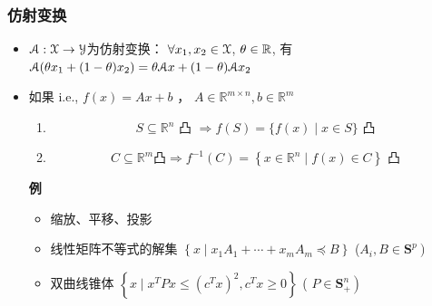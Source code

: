 \documentclass[handout]{beamer}
\begin{document}
\begin{frame}
	\frametitle{仿射变换}

\begin{itemize}
	\item {} $\mathcal{A}:\mathcal{X}\rightarrow\mathcal{Y}$为仿射变换： $\forall x_1,x_2 
	\in \mathcal{X}$, $\theta\in \mathbb{R}$, 
	有 $\mathcal{A}(\theta x_1 + (1-\theta) x_2) = \theta  \mathcal{A} x + (1-\theta) \mathcal{A} x_2$
  \item
	如果  i.e.,
$ f(x)=A x+b $ ， $ A \in \mathbb{R}^{m \times n}, b \in \mathbb{R}^{m} $
	\begin{enumerate}
		\item {}
		\begin{equation}
			S \subseteq \mathbb{R}^{n} \text { 凸 } \Longrightarrow f(S)=\{f(x) \mid x \in S\} \text { 凸 }
		\end{equation}
		\item {}
		\begin{equation}
			C \subseteq \mathbb{R}^{m} \text {凸} \Longrightarrow f^{-1}(C)=\left\{x \in \mathbb{R}^{n} \mid f(x) \in C\right\} \text { 凸 }
		\end{equation}
	\end{enumerate}


\textbf{例}
\begin{itemize}
	\item 缩放、平移、投影
	\item 线性矩阵不等式的解集 $\left\{x \mid x_{1} A_{1}+\cdots+x_{m} A_{m} \preceq B\right\}$ ($\left.A_{i}, B \in \mathbf{S}^{p}\right)$
	\item 双曲线锥体 $\left\{x \mid x^{T} P x \leq\left(c^{T} x\right)^{2}, c^{T} x \geq 0\right\}$ ( $\left.P \in \mathbf{S}_{+}^{n}\right)$
\end{itemize}

\end{itemize}
\end{frame}
\end{document}
